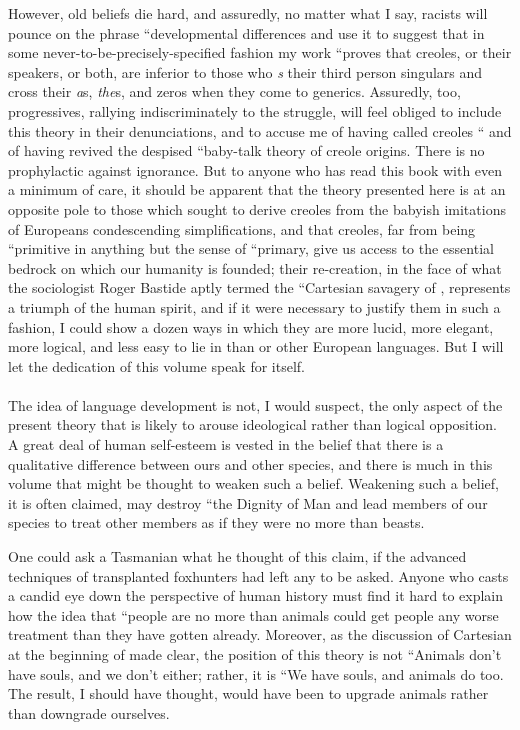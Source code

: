 However, old beliefs die hard, and assuredly, no matter what I say, racists will pounce on the phrase ``developmental differences and use it to suggest that in some never-to-be-precisely-specified fashion my work ``proves that creoles, or their speakers, or both, are inferior to those who \textit{s} their third person singulars and cross their \textit{a}s, \textit{the}s, and zeros when they come to generics. Assuredly, too, progressives, rallying indiscriminately to the struggle, will feel obliged to include this theory in their denunciations, and to accuse me of having called creoles `` and of having revived the despised ``baby-talk theory of creole origins. There is no prophylactic against ignorance. But to anyone who has read this book with even a minimum of care, it should be apparent that the theory presented here is at an opposite pole to those which sought to derive creoles from the babyish imitations of Europeans condescending simplifications, and that creoles, far from being ``primitive in anything but the sense of ``primary, give us access to the essential bedrock on which our humanity is founded; their re-creation, in the face of what the  sociologist Roger Bastide aptly termed the ``Cartesian savagery of , represents a triumph of the human spirit, and if it were necessary to justify them in such a fashion, I could show a dozen ways in which they are more lucid, more elegant, more logical, and less easy to lie in than  or other European languages. But I will let the dedication of this volume speak for itself.\\\\

The idea of language development is not, I would suspect, the only aspect of the present theory that is likely to arouse ideological rather than logical opposition. A great deal of human self-esteem is vested in the belief that there is a qualitative difference between ours and other species, and there is much in this volume that might be thought to weaken such a belief. Weakening such a belief, it is often claimed, may destroy ``the Dignity of Man and lead members of our species to treat other members as if they were no more than beasts.

One could ask a Tasmanian what he thought of this claim, if the advanced techniques of transplanted  foxhunters had
left any  to be asked. Anyone who casts a candid eye down the perspective of human history must find it hard to explain how the idea that ``people are no more than animals could get people any worse treatment than they have gotten already. Moreover, as the discussion of Cartesian  at the beginning of  made clear, the position of this theory is not ``Animals don't have souls, and we don't either; rather, it is ``We have souls, and animals do too. The result, I should have thought, would have been to upgrade animals rather than downgrade ourselves.

